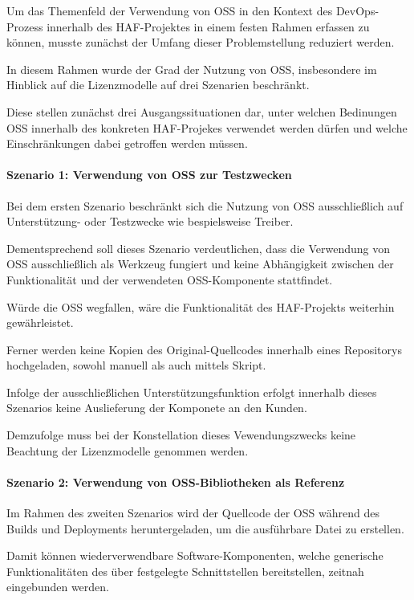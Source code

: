 Um das Themenfeld der Verwendung von OSS in den Kontext des DevOps-Prozess innerhalb des HAF-Projektes in einem festen Rahmen erfassen zu können, musste zunächst der Umfang dieser Problemstellung reduziert werden.  

In diesem Rahmen wurde der Grad der Nutzung von OSS, insbesondere im Hinblick auf die Lizenzmodelle auf drei Szenarien beschränkt. 

Diese stellen zunächst drei Ausgangssituationen dar, unter welchen Bedinungen OSS innerhalb des konkreten HAF-Projekes verwendet werden dürfen und welche Einschränkungen dabei getroffen werden müssen.   

\paragraph{Szenario 1: Verwendung von OSS zur Testzwecken}

Bei dem ersten Szenario beschränkt sich die Nutzung von OSS ausschließlich auf Unterstützung- oder Testzwecke wie bespielsweise Treiber. 

Dementsprechend soll dieses Szenario verdeutlichen, dass die Verwendung von OSS ausschließlich als Werkzeug fungiert und keine Abhängigkeit zwischen der Funktionalität und der verwendeten OSS-Komponente stattfindet. 

Würde die OSS wegfallen, wäre die Funktionalität des HAF-Projekts weiterhin gewährleistet. 

Ferner werden keine Kopien des Original-Quellcodes innerhalb eines Repositorys hochgeladen, sowohl manuell als auch mittels Skript. 

Infolge der ausschließlichen Unterstützungsfunktion erfolgt innerhalb dieses Szenarios keine Auslieferung der Komponete an den Kunden. 

Demzufolge muss bei der Konstellation dieses Vewendungszwecks keine Beachtung der Lizenzmodelle genommen werden. 

\paragraph{Szenario 2: Verwendung von OSS-Bibliotheken als Referenz}

Im Rahmen des zweiten Szenarios wird der Quellcode der OSS während des Builds und Deployments heruntergeladen, um die ausführbare Datei zu erstellen. 

Damit können wiederverwendbare Software-Komponenten, welche generische Funktionalitäten des über festgelegte Schnittstellen bereitstellen, zeitnah eingebunden werden.

